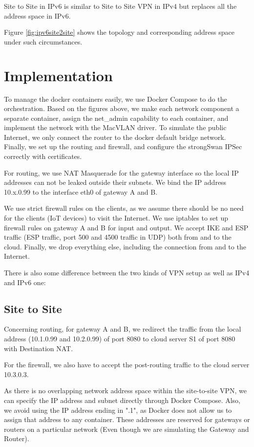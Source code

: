 \documentclass[article]{aaltoseries}
\begin{document}
Site to Site in IPv6 is similar to Site to Site VPN in IPv4 but replaces all the address space in IPv6.

Figure \ref{fig:ipv6site2site} shows the topology and corresponding address space under such circumstances.



\section{Implementation}

To manage the docker containers easily, we use Docker Compose to do the orchestration. Based on the figures above, we make each network component a separate container, assign the net\_admin capability to each container, and implement the network with the MacVLAN driver. To simulate the public Internet, we only connect the router to the docker default bridge network. Finally, we set up the routing and firewall, and configure the strongSwan IPSec correctly with certificates.

For routing, we use NAT Masquerade for the gateway interface so the local IP addresses can not be leaked outside their subnets. We bind the IP address 10.x.0.99 to the interface eth0 of gateway A and B.

We use strict firewall rules on the clients, as we assume there should be no need for the clients (IoT devices) to visit the Internet. We use iptables to set up firewall rules on gateway A and B for input and output. We accept IKE and ESP traffic (ESP traffic, port 500 and 4500 traffic in UDP) both from and to the cloud. Finally, we drop everything else, including the connection from and to the Internet.

There is also some difference between the two kinds of VPN setup as well as IPv4 and IPv6 one:

\subsection{Site to Site}

Concerning routing, for gateway A and B, we redirect the traffic from the local address (10.1.0.99 and 10.2.0.99) of port 8080 to cloud server S1 of port 8080 with Destination NAT.

For the firewall, we also have to accept the post-routing traffic to the cloud server 10.3.0.3.

As there is no overlapping network address space within the site-to-site VPN, we can specify the IP address and subnet directly through Docker Compose. Also, we avoid using the IP address ending in ".1", as Docker does not allow us to assign that address to any container. These addresses are reserved for gateways or routers on a particular network (Even though we are simulating the Gateway and Router).
\end{document}

